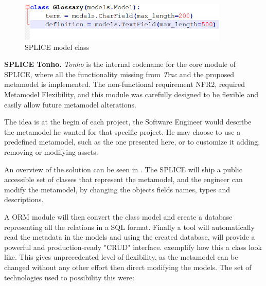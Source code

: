 \begin{figure}[htp]
\begin{center}
  \includegraphics[width=10cm]{chapters/proposed_solution/img/django-class.png}
  \caption[SPLICE Model Class]{ SPLICE model class }
  \label{fg:splice-django-class}
\end{center}
\end{figure}


\textbf{\ac{SPLICE} Tonho.} \textit{Tonho} is the internal codename for the core module of \ac{SPLICE}, where all the functionality missing from \textit{Trac} and the proposed metamodel is implemented. The non-functional requirement NFR2, required Metamodel Flexibility, and this module was carefully designed to be flexible and easily allow future metamodel alterations.  

The idea is at the begin of each project, the Software Engineer would describe the metamodel he wanted for that specific project. He may choose to use a predefined metamodel, such as the one presented here, or to customize it adding, removing or modifying assets.

An overview of the solution can be seen in . The \ac{SPLICE} will ship a public accessible set of classes that represent the metamodel, and the engineer can modify the metamodel, by changing the objects fields names, types and descriptions. 

A \acf{ORM} module will then convert the class model and create a database representing all the relations in a SQL format. Finally a tool will automatically read the metadata in the models and using the created database, will provide a powerful and production-ready "\acf{CRUD}" interface.  exemplify how this a class look like. This gives unprecedented level of flexibility, as the metamodel can be changed without any other effort then direct modifying the models. The set of technologies used to possibility this were:


